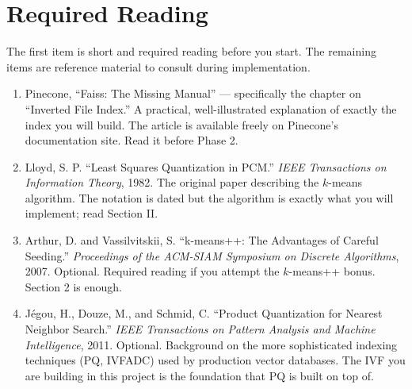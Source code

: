 \documentclass[11pt,a4paper]{article}
\begin{document}
\section{Required Reading}

The first item is short and required reading before you start. The remaining items are reference material to consult during implementation.

\begin{enumerate}
\item Pinecone, ``Faiss: The Missing Manual'' --- specifically the chapter on ``Inverted File Index.'' A practical, well-illustrated explanation of exactly the index you will build. The article is available freely on Pinecone's documentation site. Read it before Phase 2.

\item Lloyd, S. P. ``Least Squares Quantization in PCM.'' \textit{IEEE Transactions on Information Theory}, 1982. The original paper describing the $k$-means algorithm. The notation is dated but the algorithm is exactly what you will implement; read Section II.

\item Arthur, D. and Vassilvitskii, S. ``k-means++: The Advantages of Careful Seeding.'' \textit{Proceedings of the ACM-SIAM Symposium on Discrete Algorithms}, 2007. Optional. Required reading if you attempt the $k$-means++ bonus. Section 2 is enough.

\item J\'{e}gou, H., Douze, M., and Schmid, C. ``Product Quantization for Nearest Neighbor Search.'' \textit{IEEE Transactions on Pattern Analysis and Machine Intelligence}, 2011. Optional. Background on the more sophisticated indexing techniques (PQ, IVFADC) used by production vector databases. The IVF you are building in this project is the foundation that PQ is built on top of.
\end{enumerate}

\footerboxes
\end{document}
